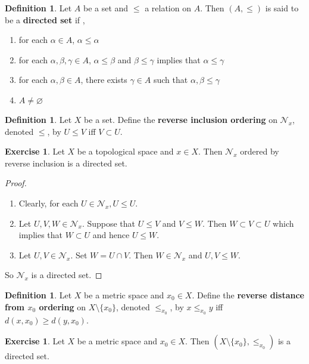 \documentclass[12pt]{amsart}
\theoremstyle{definition}
\newtheorem{defn}[definition]{Definition}
\newtheorem{ex}[definition]{Exercise}
\newcommand{\al}{\alpha}
\newcommand{\gam}{\gamma}
\newcommand{\be}{\beta}
\newcommand{\MN}{\mathcal{N}}
\newcommand{\lex}[1]{\label{ex:#1}}
\newcommand{\ld}[1]{\label{defn:#1}}
\begin{document}
	\begin{defn} \ld{33001}
	Let $A$ be a set and $\leq$ a relation on $A$. Then $(A, \leq)$ is said to be a \textbf{directed set} if , 
	\begin{enumerate}
	\item for each $\al \in A$, $\al \leq \al$
	\item for each $\al, \be, \gam \in A$, $\al \leq \be$ and $\be \leq \gam$ implies that $\al \leq \gam$
	\item for each $\al, \be \in A$, there exists $\gam \in A$ such that $\al, \be \leq \gam$
	\item $A \neq \varnothing$
	\end{enumerate}
	\end{defn}
	
	\begin{defn} \ld{33002}
	Let $X$ be a set. Define the \textbf{reverse inclusion ordering} on $\MN_x$, denoted $\leq$, by $U \leq V$ iff $V \subset U$. 
	\end{defn}
	
	\begin{ex} \lex{33003}
	Let $X$ be a topological space and $x \in X$. Then $\MN_x$ ordered by reverse inclusion is a directed set.
	\end{ex}
	
	\begin{proof}\
	\begin{enumerate}
	\item Clearly, for each $U \in \MN_x, U \leq U$.
	\item Let $U,V,W \in \MN_x$. Suppose that $U \leq V$ and $V \leq W$. Then $W \subset V \subset U$ which implies that $W \subset U$ and hence $U \leq W$.
	\item Let $U,V \in \MN_x$. Set $W = U \cap V$. Then $W \in \MN_x$ and $U,V \leq W$. 
	\end{enumerate}
	So $\MN_x$ is a directed set. 
	\end{proof}

	\begin{defn}
		Let $X$ be a metric space and $x_0 \in X$. Define the \textbf{reverse distance from $x_0$ ordering} on $X \setminus \{x_0\}$, denoted $\leq_{x_0}$, by $x \leq_{x_0} y$ iff $d(x, x_0) \geq d(y, x_0)$.
	\end{defn}

	\begin{ex}
		 Let $X$ be a metric space and $x_0 \in X$. Then $(X \setminus \{x_0\}, \leq_{x_0})$ is a directed set. 
	\end{ex}
\end{document}
